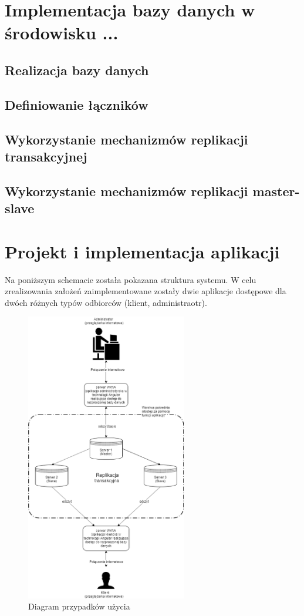 \documentclass{article}
\begin{document}
\section{Implementacja bazy danych w środowisku ...}
	\subsection{Realizacja bazy danych}
	\newpage
	\subsection{Definiowanie łączników}
	\newpage
	\subsection{Wykorzystanie mechanizmów replikacji transakcyjnej}
	\newpage
	\subsection{Wykorzystanie mechanizmów replikacji master-slave}
	\newpage
\section{Projekt i implementacja aplikacji}
Na poniższym schemacie została pokazana struktura systemu. W celu zrealizowania założeń zaimplementowane zostały dwie aplikacje dostępowe dla dwóch różnych typów odbiorców (klient, administraotr).
			\begin{figure}[hbt!]
				\includegraphics[width=7cm]{Files/Pictures/SystemStruct}
				\centering
				\caption{Diagram przypadków użycia}
			\end{figure}
			\newpage
\end{document}
